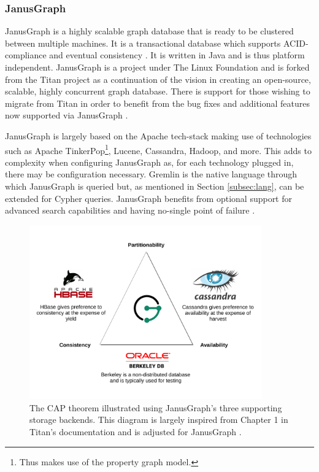 \subsubsection{JanusGraph}

JanusGraph is a highly scalable graph database that is ready to be clustered between multiple machines. It is a transactional database which supports ACID-compliance and eventual consistency \cite{janusgraph-main}. It is written in Java and is thus platform independent. JanusGraph is a project under The Linux Foundation and is forked from the Titan project as a continuation of the vision in creating an open-source, scalable, highly concurrent graph database. There is support for those wishing to migrate from Titan in order to benefit from the bug fixes and additional features now supported via JanusGraph \cite{janusgraph-titan}.

JanusGraph is largely based on the Apache tech-stack making use of technologies such as Apache TinkerPop\footnote{Thus makes use of the property graph model.}, Lucene, Cassandra, Hadoop, and more. This adds to complexity when configuring JanusGraph as, for each technology plugged in, there may be configuration necessary. Gremlin is the native language through which JanusGraph is queried but, as mentioned in Section \ref{subsec:lang}, can be extended for Cypher queries. JanusGraph benefits from optional support for advanced search capabilities and having no-single point of failure \cite{janusgraph-docs}.

\begin{figure}[h]
    \centering
    \includegraphics[width=10cm]{img/CAP.pdf}
    \caption{The CAP theorem illustrated using JanusGraph's three supporting storage backends. This diagram is largely inspired from Chapter 1 in Titan's documentation and is adjusted for JanusGraph \cite{titan-cap}.}
    \label{fig:janusgraph-cap}
\end{figure}

